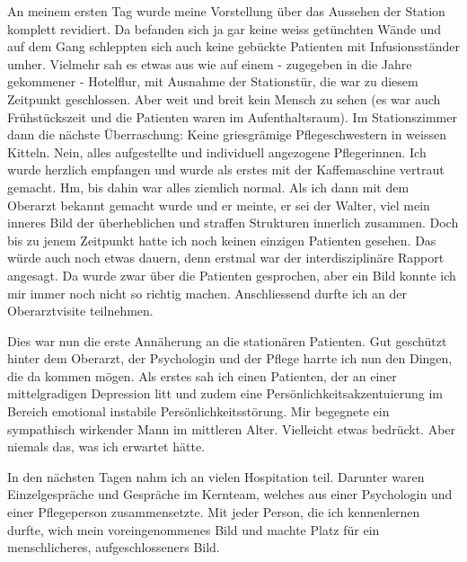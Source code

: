 \documentclass[jou,apacite]{apa6}
\begin{document}
An meinem ersten Tag wurde meine Vorstellung über das Aussehen der Station komplett revidiert. Da befanden sich ja gar keine weiss getünchten Wände und auf dem Gang schleppten sich auch keine gebückte Patienten mit Infusionsständer umher. Vielmehr sah es etwas aus wie auf einem - zugegeben in die Jahre gekommener - Hotelflur, mit Ausnahme der Stationstür, die war zu diesem Zeitpunkt geschlossen. Aber weit und breit kein Mensch zu sehen (es war auch Frühstückszeit und die Patienten waren im Aufenthaltsraum). Im Stationszimmer dann die nächste Überraschung: Keine griesgrämige Pflegeschwestern in weissen Kitteln. Nein, alles aufgestellte und individuell angezogene Pflegerinnen. Ich wurde herzlich empfangen und wurde als erstes mit der Kaffemaschine vertraut gemacht. Hm, bis dahin war alles ziemlich normal. Als ich dann mit dem Oberarzt bekannt gemacht wurde und er meinte, er sei der Walter, viel mein inneres Bild der überheblichen und straffen Strukturen innerlich zusammen. Doch bis zu jenem Zeitpunkt hatte ich noch keinen einzigen Patienten gesehen. Das würde auch noch etwas dauern, denn erstmal war der interdisziplinäre Rapport angesagt. Da wurde zwar über die Patienten gesprochen, aber ein Bild konnte ich mir immer noch nicht so richtig machen. Anschliessend durfte ich an der Oberarztvisite teilnehmen. 

Dies war nun die erste Annäherung an die stationären Patienten. Gut geschützt hinter dem Oberarzt, der Psychologin und der Pflege harrte ich nun den Dingen, die da kommen mögen. Als erstes sah ich einen Patienten, der an einer mittelgradigen Depression litt und zudem eine Persönlichkeitsakzentuierung im Bereich emotional instabile Persönlichkeitsstörung. Mir begegnete ein sympathisch wirkender Mann im mittleren Alter. Vielleicht etwas bedrückt. Aber niemals das, was ich erwartet hätte.  

In den nächsten Tagen nahm ich an vielen Hospitation teil. Darunter waren Einzelgespräche und Gespräche im Kernteam, welches aus einer Psychologin und einer Pflegeperson zusammensetzte. Mit jeder Person, die ich kennenlernen durfte, wich mein voreingenommenes Bild und machte Platz für ein menschlicheres, aufgeschlosseners Bild. 
\end{document}

